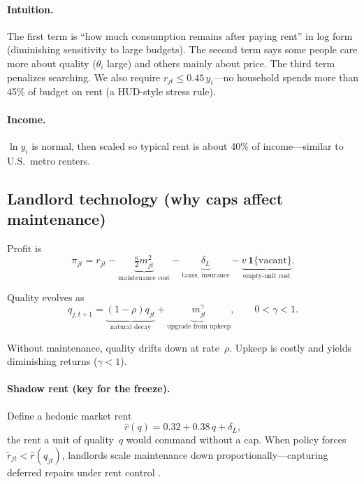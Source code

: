 \documentclass[11pt,a4paper]{article}
\begin{document}
\paragraph{Intuition.} The first term is ``how much consumption remains after paying rent'' in log form (diminishing sensitivity to large budgets). The second term says some people care more about quality ($\theta_i$ large) and others mainly about price. The third term penalizes searching. We also require $r_{jt}\le 0.45\,y_i$---no household spends more than 45\% of budget on rent (a HUD-style stress rule).

\paragraph{Income.} $\ln y_i$ is normal, then scaled so typical rent is about 40\% of income---similar to U.S.\ metro renters.

\subsection{Landlord technology (why caps affect maintenance)}

Profit is
\begin{equation}
    \pi_{jt}=r_{jt}-\underbrace{\tfrac{\kappa}{2}m_{jt}^2}_{\text{maintenance cost}}
    -\underbrace{\delta_L}_{\text{taxes, insurance}}
    -\underbrace{v\,\mathbf{1}\{\text{vacant}\}}_{\text{empty-unit cost}}.
    \label{eq:profit}
\end{equation}

Quality evolves as
\begin{equation}
    q_{j,t+1}=\underbrace{(1-\rho)q_{jt}}_{\text{natural decay}}+\underbrace{m_{jt}^{\gamma}}_{\text{upgrade from upkeep}},
    \qquad 0<\gamma<1.
    \label{eq:quality}
\end{equation}

Without maintenance, quality drifts down at rate~$\rho$. Upkeep is costly and yields diminishing returns ($\gamma<1$).

\paragraph{Shadow rent (key for the freeze).} Define a hedonic market rent
\begin{equation}
    \hat r(q)=0.32+0.38\,q+\delta_L,
    \label{eq:hedonic}
\end{equation}
the rent a unit of quality~$q$ would command without a cap. When policy forces $\tilde r_{jt}<\hat r(q_{jt})$, landlords scale maintenance down proportionally---capturing deferred repairs under rent control \citep{glaeser2003}.
\end{document}
